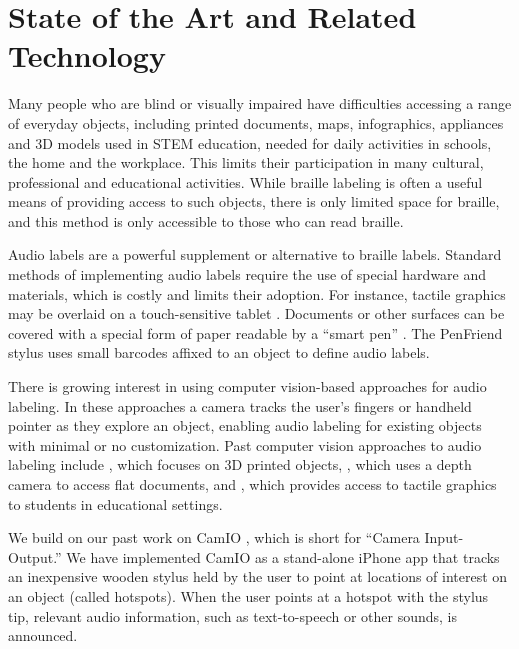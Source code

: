\documentclass[runningheads]{res/templates/llncs}
\begin{document}
\hypertarget{sota}{%
\section{State of the Art and Related Technology}\label{sota}}

Many people who are blind or visually impaired have difficulties
accessing a range of everyday objects, including printed documents,
maps, infographics, appliances and 3D models used in STEM education,
needed for daily activities in schools, the home and the workplace. This
limits their participation in many cultural, professional and
educational activities. While braille labeling is often a useful means
of providing access to such objects, there is only limited space for
braille, and this method is only accessible to those who can read
braille.

Audio labels are a powerful supplement or alternative to braille labels.
Standard methods of implementing audio labels require the use of special
hardware and materials, which is costly and limits their adoption. For
instance, tactile graphics may be overlaid on a touch-sensitive tablet
\cite{TalkingTactileTablet}. Documents or other surfaces can be covered
with a special form of paper readable by a ``smart pen''
\cite{mieleTalkingTactileApps2010}. The PenFriend
\cite{kendrickPenFriendTouchMemo2011} stylus uses small barcodes affixed
to an object to define audio labels.

There is growing interest in using computer vision-based approaches for
audio labeling. In these approaches a camera tracks the user's fingers
or handheld pointer as they explore an object, enabling audio labeling
for existing objects with minimal or no customization. Past computer
vision approaches to audio labeling include
\cite{shiMarkitTalkitLowBarrier2017}, which focuses on 3D printed
objects, \cite{thevinAugmentedRealityPeople2018}, which uses a depth
camera to access flat documents, and
\cite{fuscoTactileGraphicsHelper2015}, which provides access to tactile
graphics to students in educational settings.

We build on our past work on CamIO
\cite{shenCamIO3DComputer2013,coughlanEvaluatingAuthorUser2017,coughlanTowardsAccessibleAudioLabeling2020},
which is short for ``Camera Input-Output.'' We have implemented CamIO as
a stand-alone iPhone app that tracks an inexpensive wooden stylus held
by the user to point at locations of interest on an object (called
hotspots). When the user points at a hotspot with the stylus tip,
relevant audio information, such as text-to-speech or other sounds, is
announced.
\end{document}
